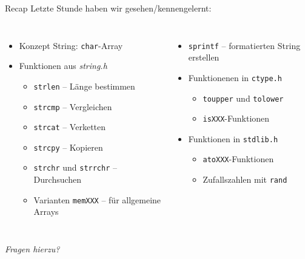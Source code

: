 
\begin{frame}[t,plain]
\titlepage
\end{frame}


\begin{frame}{Recap}
%
Letzte Stunde haben wir gesehen/kennengelernt:
%
\begin{columns}[T]
\begin{itemize}
\item Konzept String: \texttt{char}-Array
\item Funktionen aus \emph{string.h}
	\begin{itemize}
	\item \texttt{strlen} -- Länge bestimmen
	\item \texttt{strcmp} -- Vergleichen
	\item \texttt{strcat} -- Verketten
	\item \texttt{strcpy} -- Kopieren
	\item \texttt{strchr} und \texttt{strrchr} -- Durchsuchen
	\item Varianten \texttt{memXXX} -- für allgemeine Arrays
	\end{itemize}
\end{itemize}
%
\begin{itemize}
\item \texttt{sprintf} -- formatierten String erstellen
\item Funktionenen in \texttt{ctype.h}
	\begin{itemize}
	\item \texttt{toupper} und \texttt{tolower}
	\item \texttt{isXXX}-Funktionen
	\end{itemize}
\item Funktionen in \texttt{stdlib.h}
	\begin{itemize}
	\item \texttt{atoXXX}-Funktionen
	\item Zufallszahlen mit \texttt{rand}
	\end{itemize}
\end{itemize}
\end{columns}
\begin{center}
\emph{Fragen hierzu?}
\end{center}
%
\end{frame}

